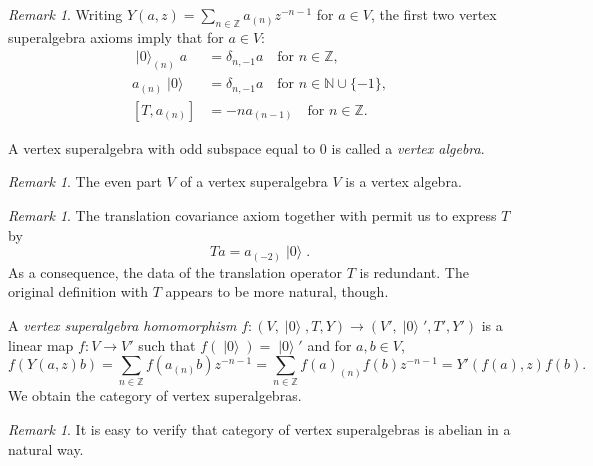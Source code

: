 \documentclass[a4paper, 12pt, reqno]{amsart}
\theoremstyle{remark}
\newtheorem{remark}[theorem]{Remark}
\numberwithin{equation}{subsection}
\DeclareMathOperator{\vac}{|0\rangle}
\DeclareMathOperator{\zero}{\overline{0}}
\begin{document}
\begin{remark}
  \label{rmk:9}
  Writing $Y(a, z) = \sum_{n \in \mathbb{Z}}a_{(n)}z^{-n - 1}$ for $a \in V$, the first two vertex superalgebra axioms imply that for $a \in V$:
  \begin{align*}
    \vac_{(n)}a &= \delta_{n, -1}a \quad \text{for }n \in \mathbb{Z}, \\
    a_{(n)}\vac &= \delta_{n, -1}a \quad \text{for }n \in \mathbb{N} \cup \{-1\}, \\
    [T, a_{(n)}] &= -na_{(n - 1)} \quad \text{for }n \in \mathbb{Z}.
  \end{align*}
\end{remark}

A vertex superalgebra with odd subspace equal to $0$ is called a \emph{vertex algebra}.

\begin{remark}
  \label{rmk:10}
  The even part $V_{\zero}$ of a vertex superalgebra $V$ is a vertex algebra.
\end{remark}

\begin{remark}
  \label{rmk:11}
  The translation covariance axiom together with  permit us to express $T$ by
  \begin{equation}
    \label{eq:12}
    Ta = a_{(-2)}\vac.
  \end{equation}
  As a consequence, the data of the translation operator $T$ is redundant.
  The original definition with $T$ appears to be more natural, though.
\end{remark}

A \emph{vertex superalgebra homomorphism} $f: (V, \vac, T, Y) \to (V', \vac', T', Y')$ is a linear map $f: V \to V'$ such that $f(\vac) = \vac'$ and for $a, b \in V$,
\begin{equation*}
  f(Y(a, z)b) = \sum_{n \in \mathbb{Z}}f(a_{(n)}b)z^{-n - 1} = \sum_{n \in \mathbb{Z}}f(a)_{(n)}f(b)z^{-n - 1} = Y'(f(a), z)f(b).
\end{equation*}
We obtain the category of vertex superalgebras.

\begin{remark}
  \label{rmk:12}
  It is easy to verify that category of vertex superalgebras is abelian in a natural way.
\end{remark}
\end{document}
